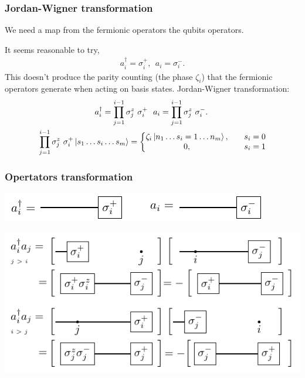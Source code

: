 \documentclass{beamer}
\renewcommand{\(}{\left(}
\renewcommand{\)}{\right)}
\renewcommand{\[}{\left[}
\renewcommand{\]}{\right]}
\begin{document}
\begin{frame}
    \frametitle{Jordan-Wigner transformation}
    \begin{framed}
        We need a map from the fermionic operators the qubits operators.
    \end{framed}
    It seems reasonable to try, 
    \begin{align*}
        a^\dagger_i = \sigma_i^{+} , \ \  a_i = \sigma_i^{-}. 
    \end{align*}
    This doesn't produce the parity counting (the phase $\zeta_i$) that the fermionic operators generate when acting on basis states. 
    \pause
    Jordan-Wigner transformation: 
    \begin{align*}
        &\qquad \qquad \qquad \quad a^\dagger_i = \prod_{j = 1}^{i-1} \sigma^{z}_j \  \sigma_i^{+} \ \  a_i =  \prod_{j = 1}^{i-1} \sigma^{z}_j \  \sigma_i^{-}. \\
        &\prod_{j = 1}^{i-1} \sigma^{z}_j \  \sigma^{+}_i \ket{s_1 \dots s_i \dots s_m} = \left\{ \begin{matrix}
            \zeta_i \ket{n_1 \dots s_i = 1 \dots n_m}, && s_i = 0 \\ 
            0, && s_i = 1
        \end{matrix} \right.
    \end{align*}

\end{frame}

\begin{frame}
    \frametitle{Opertators transformation}
    \begin{center}
        \includegraphics[]{jordan_wigner.pdf}
    \end{center}
    \pause
    \vspace{20pt}
    \begin{center}
        \includegraphics[scale = 1]{operator_jordan_wigner.pdf}
    \end{center}

\end{frame}
\end{document}
